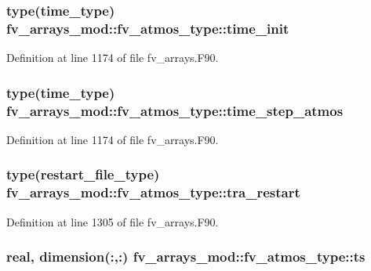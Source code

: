 \subsubsection[{time\-\_\-init}]{\setlength{\rightskip}{0pt plus 5cm}type(time\-\_\-type) fv\-\_\-arrays\-\_\-mod\-::fv\-\_\-atmos\-\_\-type\-::time\-\_\-init}\label{structfv__arrays__mod_1_1fv__atmos__type_a2250fa17165a7e44f75420a519cc72cf}


Definition at line 1174 of file fv\-\_\-arrays.\-F90.

\subsubsection[{time\-\_\-step\-\_\-atmos}]{\setlength{\rightskip}{0pt plus 5cm}type(time\-\_\-type) fv\-\_\-arrays\-\_\-mod\-::fv\-\_\-atmos\-\_\-type\-::time\-\_\-step\-\_\-atmos}\label{structfv__arrays__mod_1_1fv__atmos__type_aaff3c348215efb0095c2e8c196efe1a7}


Definition at line 1174 of file fv\-\_\-arrays.\-F90.

\subsubsection[{tra\-\_\-restart}]{\setlength{\rightskip}{0pt plus 5cm}type(restart\-\_\-file\-\_\-type) fv\-\_\-arrays\-\_\-mod\-::fv\-\_\-atmos\-\_\-type\-::tra\-\_\-restart}\label{structfv__arrays__mod_1_1fv__atmos__type_ab394a0387bd944dd57cb09a3abc5abfa}


Definition at line 1305 of file fv\-\_\-arrays.\-F90.

\subsubsection[{ts}]{\setlength{\rightskip}{0pt plus 5cm}real, dimension(\-:,\-:) fv\-\_\-arrays\-\_\-mod\-::fv\-\_\-atmos\-\_\-type\-::ts}\label{structfv__arrays__mod_1_1fv__atmos__type_a0b442abb8ea87c4c65eda345a9ed2fb4}


